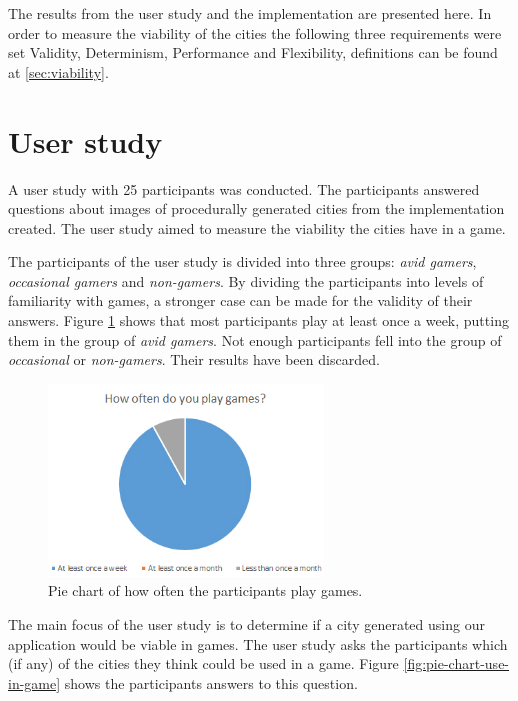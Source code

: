 The results from the user study and the implementation are presented here. In order to measure the viability of the cities the following three requirements were set Validity, Determinism, Performance and Flexibility, definitions can be found at \ref{sec:viability}.
	
\section{User study}
A user study with 25 participants was conducted. The participants answered questions about images of procedurally generated cities from the implementation created. The user study aimed to measure the viability the cities have in a game.
	

\par
The participants of the user study is divided into three groups: \textit{avid gamers}, \textit{occasional gamers} and \textit{non-gamers}. By dividing the participants into levels of familiarity with games, a stronger case can be made for the validity of their answers. Figure \ref{fig:pie-chart-often-play} shows that most participants play at least once a week, putting them in the group of \textit{avid gamers}. Not enough participants fell into the group of \textit{occasional} or \textit{non-gamers}. Their results have been discarded.

\begin{figure}[h]
	\centering
	\includegraphics[width=0.65\textwidth]{"Images/OftenPlay"}
	\caption{Pie chart of how often the participants play games.}
	\label{fig:pie-chart-often-play}
\end{figure}

The main focus of the user study is to determine if a city generated using our application would be viable in games. The user study asks the participants which (if any) of the cities they think could be used in a game. Figure \ref{fig:pie-chart-use-in-game} shows the participants answers to this question.

